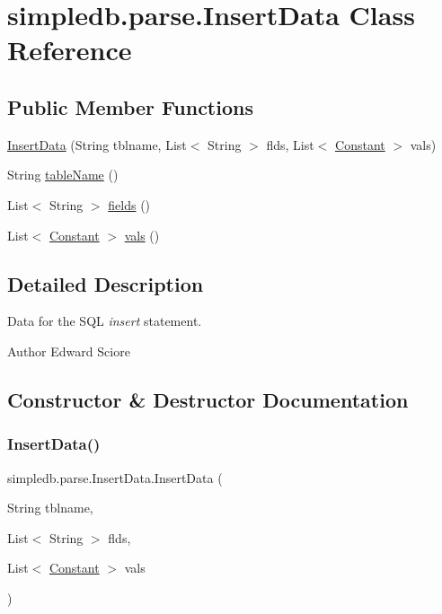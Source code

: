 \hypertarget{classsimpledb_1_1parse_1_1InsertData}{}\section{simpledb.\+parse.\+Insert\+Data Class Reference}
\label{classsimpledb_1_1parse_1_1InsertData}
\subsection*{Public Member Functions}
\begin{DoxyCompactItemize}
\item 
\hyperlink{classsimpledb_1_1parse_1_1InsertData_add9a9bcf6380613202291ade6f0c121a}{Insert\+Data} (String tblname, List$<$ String $>$ flds, List$<$ \hyperlink{classsimpledb_1_1query_1_1Constant}{Constant} $>$ vals)
\item 
String \hyperlink{classsimpledb_1_1parse_1_1InsertData_aab0d64b2fe9bf60a34e2341cc515fae9}{table\+Name} ()
\item 
List$<$ String $>$ \hyperlink{classsimpledb_1_1parse_1_1InsertData_a961e06a30097c81b78a7f6328274c3c3}{fields} ()
\item 
List$<$ \hyperlink{classsimpledb_1_1query_1_1Constant}{Constant} $>$ \hyperlink{classsimpledb_1_1parse_1_1InsertData_a9f16fbf1c7a4e544d5cc6f17ca915469}{vals} ()
\end{DoxyCompactItemize}


\subsection{Detailed Description}
Data for the S\+QL {\itshape insert} statement. \begin{DoxyAuthor}{Author}
Edward Sciore 
\end{DoxyAuthor}


\subsection{Constructor \& Destructor Documentation}
\mbox{\label{classsimpledb_1_1parse_1_1InsertData_add9a9bcf6380613202291ade6f0c121a}} 
\subsubsection{\texorpdfstring{Insert\+Data()}{InsertData()}}
{\footnotesize\ttfamily simpledb.\+parse.\+Insert\+Data.\+Insert\+Data (\begin{DoxyParamCaption}\item[{String}]{tblname,  }\item[{List$<$ String $>$}]{flds,  }\item[{List$<$ \hyperlink{classsimpledb_1_1query_1_1Constant}{Constant} $>$}]{vals }\end{DoxyParamCaption})\hspace{0.3cm}{\ttfamily [inline]}}

